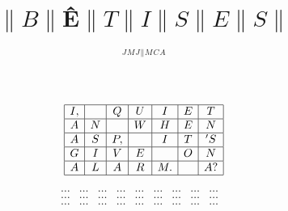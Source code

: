 \documentclass[titlepage, 12pt]{article}
\title{{$\|B\|$\^E$\|T\|I\|S\|E\|S\|$}}
\author{${}^J{}^M{}^J{}^\| {}^M{}^C{}^A$}
\date{}
\begin{document}
\maketitle

\begin{equation*}
    \left.
    \begin{array}{|c|c|c|c|c|c|c|}
        \hline I, & {} & Q & U & I & E & T \\
        \hline A & N & {} & W & H & E & N \\
        \hline A & S & P, & {} & I & T & 'S \\
        \hline G & I & V & E & {} & O & N \\
        \hline A & L & A & R & M. & {} & A? \\
        \hline 
    \end{array}
    \right.
\end{equation*}

\begin{equation*} 
    \begin{matrix}
        \dots & \dots & \dots & \dots & \dots & \dots & \dots & \dots & \dots & \\
        \dots & \dots & \dots & \dots & \dots & \dots & \dots & \dots & \dots & \\ 
        \dots & \dots & \dots & \dots & \dots & \dots & \dots & \dots & \dots & \\ 
     \end{matrix} 
\end{equation*}
\end{document}
